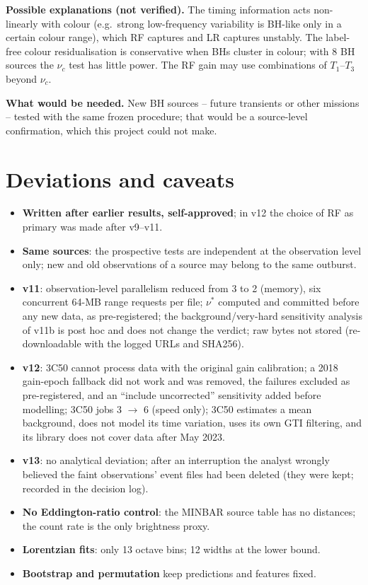 \textbf{Possible explanations (not verified).} The timing information acts non-linearly with colour (e.g.\ strong low-frequency variability
is BH-like only in a certain colour range), which RF captures and LR captures unstably. The label-free colour residualisation is
conservative when BHs cluster in colour; with 8 BH sources the $\nu_c$ test has little power. The RF gain may use combinations of
$T_1$--$T_3$ beyond $\nu_c$.

\textbf{What would be needed.} New BH sources -- future transients or other missions -- tested with the same frozen procedure; that would
be a source-level confirmation, which this project could not make.

\section{Deviations and caveats}\label{sec:p6caveats}
\begin{itemize}
\item \textbf{Written after earlier results, self-approved}; in v12 the choice of RF as primary was made after v9--v11.
\item \textbf{Same sources}: the prospective tests are independent at the observation level only; new and old observations of a source may
belong to the same outburst.
\item \textbf{v11}: observation-level parallelism reduced from 3 to 2 (memory), six concurrent 64-MB range requests per file; $\nu^*$ computed and
committed before any new data, as pre-registered; the background/very-hard sensitivity analysis of v11b is post hoc and does not change
the verdict; raw bytes not stored (re-downloadable with the logged URLs and SHA256).
\item \textbf{v12}: 3C50 cannot process data with the original gain calibration; a 2018 gain-epoch fallback did not work and was removed, the
failures excluded as pre-registered, and an ``include uncorrected'' sensitivity added before modelling; 3C50 jobs 3 $\to$ 6 (speed only); 3C50
estimates a mean background, does not model its time variation, uses its own GTI filtering, and its library does not cover data after
May 2023.
\item \textbf{v13}: no analytical deviation; after an interruption the analyst wrongly believed the faint observations' event files had been
deleted (they were kept; recorded in the decision log).
\item \textbf{No Eddington-ratio control}: the MINBAR source table has no distances; the count rate is the only brightness proxy.
\item \textbf{Lorentzian fits}: only 13 octave bins; 12 widths at the lower bound.
\item \textbf{Bootstrap and permutation} keep predictions and features fixed.
\end{itemize}


